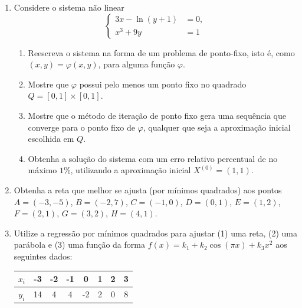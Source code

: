 \documentclass[12pt,a4paper]{article}
\begin{document}
\begin{enumerate}
\item Considere o sistema não linear
\[
\begin{cases}
3x - \ln(y + 1) &= 0,\\
x^3 + 9y &= 1
\end{cases}
\]
\begin{enumerate}
\item Reescreva o sistema na forma de um problema de ponto-fixo, isto é, como $(x,y) = \varphi(x,y)$, para alguma função $\varphi$.
\item Mostre que $\varphi$ possui pelo menos um ponto fixo no quadrado $Q = [0,1] \times [0,1]$.
\item Mostre que o método de iteração de ponto fixo gera uma sequência que converge para o ponto fixo de $\varphi$, qualquer que seja a aproximação inicial escolhida em $Q$.
\item Obtenha a solução do sistema com um erro relativo percentual de no máximo $1\%$, utilizando a aproximação inicial $X^{(0)} = (1, 1)$. 
\end{enumerate}

\item Obtenha a reta que melhor se ajusta (por mínimos quadrados) aos pontos
$A = (-3, -5)$,
$B = (-2,  7)$,
$C = (-1,  0)$,
$D = ( 0,  1)$,
$E = ( 1,  2)$,
$F = ( 2,  1)$,
$G = ( 3,  2)$,
$H = ( 4,  1)$.
\item Utilize a regressão por mínimos quadrados para ajustar (1) uma reta, (2) uma parábola e (3) uma função da forma $f(x) = k_1 + k_2 \cos(\pi x) + k_3 x^2$ aos seguintes dados:
\begin{center}
\begin{tabular}{|c|c|c|c|c|c|c|c|}
\hline
   $x_i$ & -3 & -2 & -1 &  0 & 1 & 2 & 3 \\ \hline
$y_i$ & 14 &  4 &  4 & -2 & 2 & 0 & 8 \\ \hline
\end{tabular}
\end{center}


\end{enumerate}


\newpage
\end{document}
